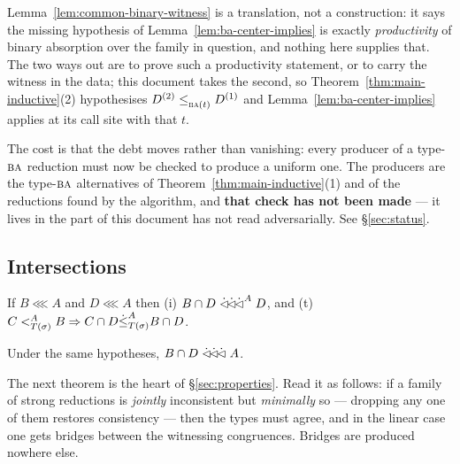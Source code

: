 \begin{hazard}\label{haz:witness-moved}
Lemma~\ref{lem:common-binary-witness} is a translation, not a construction: it
says the missing hypothesis of Lemma~\ref{lem:ba-center-implies} is exactly
\emph{productivity} of binary absorption over the family in question, and
nothing here supplies that. The two ways out are to prove such a productivity
statement, or to carry the witness in the data; this document takes the second,
so Theorem~\ref{thm:main-inductive}(2) hypothesises
$D^{(2)}\subte{\TBA(t)}D^{(1)}$ and Lemma~\ref{lem:ba-center-implies} applies
at its call site with that $t$.

The cost is that the debt moves rather than vanishing: every producer of a
type-$\TBA$ reduction must now be checked to produce a uniform one. The
producers are the type-$\TBA$ alternatives of
Theorem~\ref{thm:main-inductive}(1) and of the reductions found by the
algorithm, and \textbf{that check has not been made} --- it lives in the part
of \cite{ZhukSimplified} this document has not read adversarially. See
\S\ref{sec:status}.
\end{hazard}

\subsection{Intersections}

\begin{lemma}\label{lem:intersect-all}
If $B\lll A$ and $D\lll A$ then \textup{(i)} $B\cap D\dlll^{A}D$, and
\textup{(t)} $C\subt[A]{T(\sigma)}B\Rightarrow C\cap D\dsubte[A]{T(\sigma)}B\cap D$.
\end{lemma}

\begin{corollary}\label{cor:intersect-all-weak}
Under the same hypotheses, $B\cap D\dlll A$.
\end{corollary}

The next theorem is the heart of \S\ref{sec:properties}. Read it as follows:
if a family of strong reductions is \emph{jointly} inconsistent but
\emph{minimally} so --- dropping any one of them restores consistency --- then
the types must agree, and in the linear case one gets bridges between the
witnessing congruences. Bridges are produced nowhere else.

